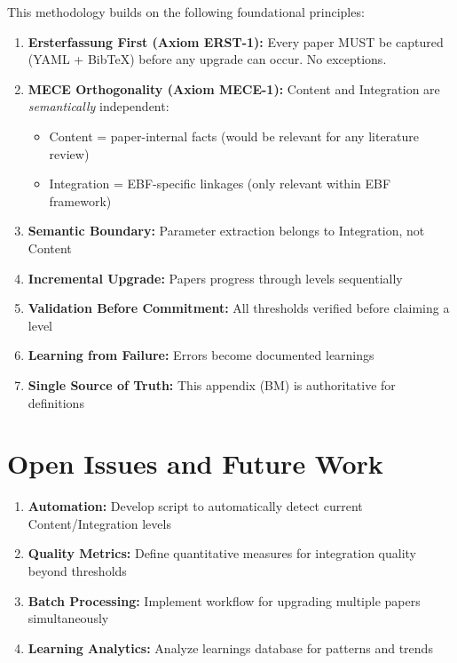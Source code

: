 This methodology builds on the following foundational principles:

\begin{enumerate}
    \item \textbf{Ersterfassung First (Axiom ERST-1):} Every paper MUST be captured (YAML + BibTeX) before any upgrade can occur. No exceptions.
    \item \textbf{MECE Orthogonality (Axiom MECE-1):} Content and Integration are \textit{semantically} independent:
    \begin{itemize}[nosep]
        \item Content = paper-internal facts (would be relevant for any literature review)
        \item Integration = EBF-specific linkages (only relevant within EBF framework)
    \end{itemize}
    \item \textbf{Semantic Boundary:} Parameter extraction belongs to Integration, not Content
    \item \textbf{Incremental Upgrade:} Papers progress through levels sequentially
    \item \textbf{Validation Before Commitment:} All thresholds verified before claiming a level
    \item \textbf{Learning from Failure:} Errors become documented learnings
    \item \textbf{Single Source of Truth:} This appendix (BM) is authoritative for definitions
\end{enumerate}


\section{Open Issues and Future Work}
\label{sec:paperint-open}

\begin{enumerate}
    \item \textbf{Automation:} Develop script to automatically detect current Content/Integration levels
    \item \textbf{Quality Metrics:} Define quantitative measures for integration quality beyond thresholds
    \item \textbf{Batch Processing:} Implement workflow for upgrading multiple papers simultaneously
    \item \textbf{Learning Analytics:} Analyze learnings database for patterns and trends
\end{enumerate}


